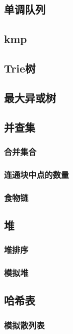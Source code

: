 \documentclass[10pt,a4paper]{article}
\begin{document}
\subsection{单调队列}

\subsection{kmp}

\subsection{Trie树}

\subsection{最大异或树}

\subsection{并查集}
\subsubsection{合并集合}

\subsubsection{连通块中点的数量}

\subsubsection{食物链}

\subsection{堆}
\subsubsection{堆排序}

\subsubsection{模拟堆}

\subsection{哈希表}
\subsubsection{模拟散列表}

\end{document}
